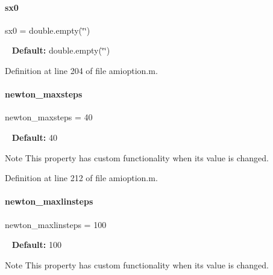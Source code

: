 \mbox{\label{classamioption_ae40f9a7172d3a41725c151afaec347f7}} 
\paragraph{\texorpdfstring{sx0}{sx0}}
{\footnotesize\ttfamily sx0 = double.\+empty(\char`\"{}\char`\"{})}

~\newline
{\bfseries Default\+:} double.\+empty(\char`\"{}\char`\"{}) 

Definition at line 204 of file amioption.\+m.

\mbox{\label{classamioption_a003c445698766726237b11dc6e5120fe}} 
\paragraph{\texorpdfstring{newton\+\_\+maxsteps}{newton\_maxsteps}}
{\footnotesize\ttfamily newton\+\_\+maxsteps = 40}

~\newline
{\bfseries Default\+:} 40

\begin{DoxyNote}{Note}
This property has custom functionality when its value is changed. 
\end{DoxyNote}


Definition at line 212 of file amioption.\+m.

\mbox{\label{classamioption_abea544569240b7cfcb1505d125a3b51b}} 
\paragraph{\texorpdfstring{newton\+\_\+maxlinsteps}{newton\_maxlinsteps}}
{\footnotesize\ttfamily newton\+\_\+maxlinsteps = 100}

~\newline
{\bfseries Default\+:} 100

\begin{DoxyNote}{Note}
This property has custom functionality when its value is changed. 
\end{DoxyNote}



